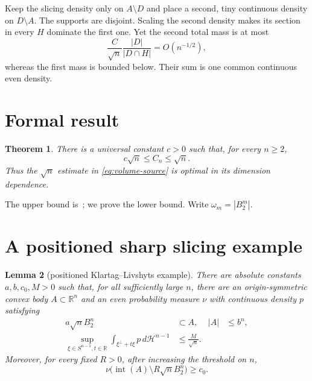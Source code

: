 \documentclass[11pt]{article}
\newtheorem{theorem}{Theorem}
\newtheorem{lemma}[theorem]{Lemma}
\newcommand{\R}{\mathbb R}
\newcommand{\cH}{\mathcal H}
\begin{document}
Keep the slicing density only on $A\setminus D$ and place a second, tiny
continuous density on $D\setminus A$. The supports are disjoint. Scaling the
second density makes its section in every $H$ dominate the first one. Yet the
second total mass is at most
\[
 \frac{C}{\sqrt n}\frac{|D|}{|D\cap H|}=O(n^{-1/2}),
\]
whereas the first mass is bounded below. Their sum is one common continuous
even density.

\section{Formal result}
\begin{theorem}\label{thm:main}
There is a universal constant $c>0$ such that, for every $n\geq2$,
\[
 c\sqrt n\leq C_n\leq\sqrt n.
\]
Thus the $\sqrt n$ estimate in \eqref{eq:volume-source} is optimal in its
dimension dependence.
\end{theorem}
The upper bound is~\cite{KZ}; we prove the lower bound. Write
$\omega_m=|B_2^m|$.

\section{A positioned sharp slicing example}
\begin{lemma}[positioned Klartag--Livshyts example]\label{lem:KL}
There are absolute constants $a,b,c_0,M>0$ such that, for all sufficiently
large $n$, there are an origin-symmetric convex body $A\subset\R^n$ and an
even probability measure $\nu$ with continuous density $p$ satisfying
\begin{align}
 a\sqrt nB_2^n&\subset A,& |A|&\leq b^n,\label{eq:inball-volume}\\
 \sup_{\xi\in S^{n-1},t\in\R}\int_{\xi^\perp+t\xi}p\,d\cH^{n-1}
 &\leq\frac{M}{\sqrt n}.\label{eq:KL-sections}
\end{align}
Moreover, for every fixed $R>0$, after increasing the threshold on $n$,
\begin{equation}\label{eq:outside-mass}
 \nu\bigl(\operatorname{int}(A)\setminus R\sqrt nB_2^n\bigr)\geq c_0.
\end{equation}
\end{lemma}
\end{document}
